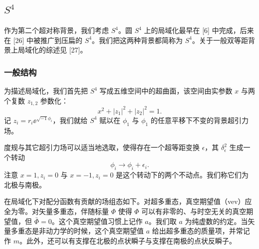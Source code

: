 \subsection{$S^4$}

作为第二个超对称背景，我们考虑 $S^4$。圆 $S^4$ 上的局域化最早在 [6] 中完成，后来在 [26] 中被推广到压扁的 $S^4$。我们把这两种背景都简称为 $S^4$。关于一般双等距背景上局域化的综述见 [27]。

\subsubsection{一般结构}

为描述局域化，我们首先把 $S^4$ 写成五维空间中的超曲面，该空间由实参数 $x$ 与两个复数 $z_{1,2}$ 参数化：
\begin{equation}
x^2+|z_1|^2+|z_2|^2=1.
\tag{4.13}
\end{equation}
记 $z_i=r_i\ee^{\sqrt{-1}\phi_i}$，我们就给 $S^4$ 赋以在 $\phi_1$ 与 $\phi_1$ 的任意平移下不变的背景超引力场。


度规与其它超引力场可以适当地选取，使得存在一个超等距变换 $\epsilon$，其 $\delta_\epsilon^2$ 生成一个转动
\begin{equation}
\phi_i\to\phi_i+\epsilon_i.
\tag{4.14}
\end{equation}
注意 $x=1,z_i=0$ 与 $x=-1,z_i=0$ 是这个转动下的两个不动点。我们称它们为北极与南极。


在局域化下对配分函数有贡献的场组态如下。对超多重态，真空期望值（vev）应全为零。对矢量多重态，伴随标量 $\Phi$ 使得 $\Phi$ 可以有非零的、与时空无关的真空期望值，但 $\bar\Phi=0$。这个真空期望值习惯上记作 $a$。我们取 $a$ 为纯虚数的约定。当矢量多重态是非动力学的时候，这个真空期望值 $a$ 给出超多重态的质量项，并常记作 $m$。此外，还可以有支撑在北极的点状瞬子与支撑在南极的点状反瞬子。

